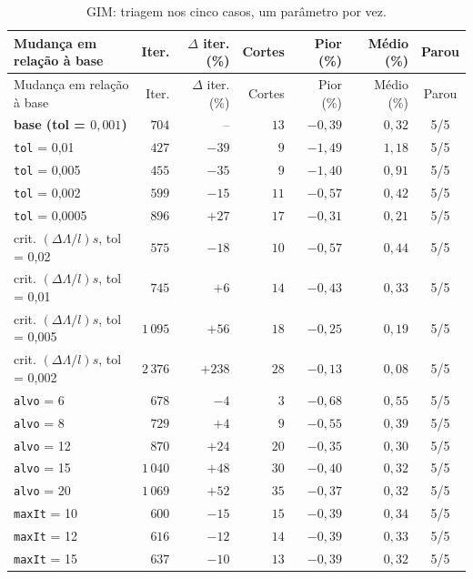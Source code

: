 \documentclass[11pt,a4paper]{article}
\numberwithin{equation}{section}
\begin{document}
{\footnotesize
\begin{longtable}{p{6.4cm}rrrrrc}
\caption{GIM: triagem nos cinco casos, um parâmetro por vez.}\label{tab:oat_gim}\\
\toprule
Mudança em relação à base & Iter. & $\Delta$ iter. (\%) & Cortes & Pior (\%) & Médio (\%) & Parou \\
\midrule
\endfirsthead
\toprule
Mudança em relação à base & Iter. & $\Delta$ iter. (\%) & Cortes & Pior (\%) & Médio (\%) & Parou \\
\midrule
\endhead
\bottomrule
\endfoot
\textbf{base (tol = $0{,}001$)} & $704$ & -- & $13$ & $-0{,}39$ & $0{,}32$ & 5/5 \\
\texttt{tol} = 0,01 & $427$ & $-39$ & $9$ & $-1{,}49$ & $1{,}18$ & 5/5 \\
\texttt{tol} = 0,005 & $455$ & $-35$ & $9$ & $-1{,}40$ & $0{,}91$ & 5/5 \\
\texttt{tol} = 0,002 & $599$ & $-15$ & $11$ & $-0{,}57$ & $0{,}42$ & 5/5 \\
\texttt{tol} = 0,0005 & $896$ & $+$$27$ & $17$ & $-0{,}31$ & $0{,}21$ & 5/5 \\
crit. $(\Delta\Lambda/l)s$, tol = 0,02 & $575$ & $-18$ & $10$ & $-0{,}57$ & $0{,}44$ & 5/5 \\
crit. $(\Delta\Lambda/l)s$, tol = 0,01 & $745$ & $+$$6$ & $14$ & $-0{,}43$ & $0{,}33$ & 5/5 \\
crit. $(\Delta\Lambda/l)s$, tol = 0,005 & $1\,095$ & $+$$56$ & $18$ & $-0{,}25$ & $0{,}19$ & 5/5 \\
crit. $(\Delta\Lambda/l)s$, tol = 0,002 & $2\,376$ & $+$$238$ & $28$ & $-0{,}13$ & $0{,}08$ & 5/5 \\
\texttt{alvo} = 6 & $678$ & $-4$ & $3$ & $-0{,}68$ & $0{,}55$ & 5/5 \\
\texttt{alvo} = 8 & $729$ & $+$$4$ & $9$ & $-0{,}55$ & $0{,}39$ & 5/5 \\
\texttt{alvo} = 12 & $870$ & $+$$24$ & $20$ & $-0{,}35$ & $0{,}30$ & 5/5 \\
\texttt{alvo} = 15 & $1\,040$ & $+$$48$ & $30$ & $-0{,}40$ & $0{,}32$ & 5/5 \\
\texttt{alvo} = 20 & $1\,069$ & $+$$52$ & $35$ & $-0{,}37$ & $0{,}32$ & 5/5 \\
\texttt{maxIt} = 10 & $600$ & $-15$ & $15$ & $-0{,}39$ & $0{,}34$ & 5/5 \\
\texttt{maxIt} = 12 & $616$ & $-12$ & $14$ & $-0{,}39$ & $0{,}33$ & 5/5 \\
\texttt{maxIt} = 15 & $637$ & $-10$ & $13$ & $-0{,}39$ & $0{,}32$ & 5/5 \\

\end{longtable}}
\end{document}
